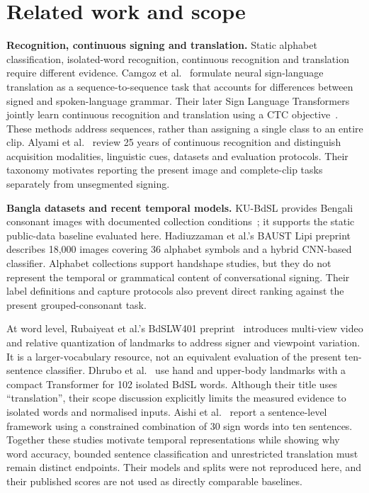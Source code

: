 \documentclass[11pt,a4paper]{article}
\begin{document}
\section{Related work and scope}
\textbf{Recognition, continuous signing and translation.}
Static alphabet classification, isolated-word recognition, continuous recognition and translation require different evidence. Camgoz et al.~\cite{nsl2018} formulate neural sign-language translation as a sequence-to-sequence task that accounts for differences between signed and spoken-language grammar. Their later Sign Language Transformers jointly learn continuous recognition and translation using a CTC objective~\cite{slt2020}. These methods address sequences, rather than assigning a single class to an entire clip. Alyami et al.~\cite{survey} review 25 years of continuous recognition and distinguish acquisition modalities, linguistic cues, datasets and evaluation protocols. Their taxonomy motivates reporting the present image and complete-clip tasks separately from unsegmented signing.

\textbf{Bangla datasets and recent temporal models.}
KU-BdSL provides Bengali consonant images with documented collection conditions~\cite{kubdsl,kudata}; it supports the static public-data baseline evaluated here. Hadiuzzaman et al.'s BAUST Lipi preprint~\cite{lipi} describes 18,000 images covering 36 alphabet symbols and a hybrid CNN-based classifier. Alphabet collections support handshape studies, but they do not represent the temporal or grammatical content of conversational signing. Their label definitions and capture protocols also prevent direct ranking against the present grouped-consonant task.

At word level, Rubaiyeat et al.'s BdSLW401 preprint~\cite{bdslw401} introduces multi-view video and relative quantization of landmarks to address signer and viewpoint variation. It is a larger-vocabulary resource, not an equivalent evaluation of the present ten-sentence classifier. Dhrubo et al.~\cite{dhrubo} use hand and upper-body landmarks with a compact Transformer for 102 isolated BdSL words. Although their title uses ``translation'', their scope discussion explicitly limits the measured evidence to isolated words and normalised inputs. Aishi et al.~\cite{sentence2025} report a sentence-level framework using a constrained combination of 30 sign words into ten sentences. Together these studies motivate temporal representations while showing why word accuracy, bounded sentence classification and unrestricted translation must remain distinct endpoints. Their models and splits were not reproduced here, and their published scores are not used as directly comparable baselines.
\end{document}
